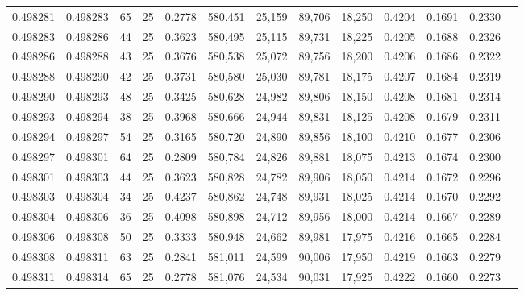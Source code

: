 \begin{tabular}{rrrrrrrrrrrrr}
0.498281 & 0.498283 &    65 &  25 &                                     0.2778 & 580,451 &  25,159 &  89,706 &  18,250 & 0.4204 & 0.1691 & 0.2330 \\
0.498283 & 0.498286 &    44 &  25 &                                     0.3623 & 580,495 &  25,115 &  89,731 &  18,225 & 0.4205 & 0.1688 & 0.2326 \\
0.498286 & 0.498288 &    43 &  25 &                                     0.3676 & 580,538 &  25,072 &  89,756 &  18,200 & 0.4206 & 0.1686 & 0.2322 \\
0.498288 & 0.498290 &    42 &  25 &                                     0.3731 & 580,580 &  25,030 &  89,781 &  18,175 & 0.4207 & 0.1684 & 0.2319 \\
0.498290 & 0.498293 &    48 &  25 &                                     0.3425 & 580,628 &  24,982 &  89,806 &  18,150 & 0.4208 & 0.1681 & 0.2314 \\
0.498293 & 0.498294 &    38 &  25 &                                     0.3968 & 580,666 &  24,944 &  89,831 &  18,125 & 0.4208 & 0.1679 & 0.2311 \\
0.498294 & 0.498297 &    54 &  25 &                                     0.3165 & 580,720 &  24,890 &  89,856 &  18,100 & 0.4210 & 0.1677 & 0.2306 \\
0.498297 & 0.498301 &    64 &  25 &                                     0.2809 & 580,784 &  24,826 &  89,881 &  18,075 & 0.4213 & 0.1674 & 0.2300 \\
0.498301 & 0.498303 &    44 &  25 &                                     0.3623 & 580,828 &  24,782 &  89,906 &  18,050 & 0.4214 & 0.1672 & 0.2296 \\
0.498303 & 0.498304 &    34 &  25 &                                     0.4237 & 580,862 &  24,748 &  89,931 &  18,025 & 0.4214 & 0.1670 & 0.2292 \\
0.498304 & 0.498306 &    36 &  25 &                                     0.4098 & 580,898 &  24,712 &  89,956 &  18,000 & 0.4214 & 0.1667 & 0.2289 \\
0.498306 & 0.498308 &    50 &  25 &                                     0.3333 & 580,948 &  24,662 &  89,981 &  17,975 & 0.4216 & 0.1665 & 0.2284 \\
0.498308 & 0.498311 &    63 &  25 &                                     0.2841 & 581,011 &  24,599 &  90,006 &  17,950 & 0.4219 & 0.1663 & 0.2279 \\
0.498311 & 0.498314 &    65 &  25 &                                     0.2778 & 581,076 &  24,534 &  90,031 &  17,925 & 0.4222 & 0.1660 & 0.2273 \\

\end{tabular}
